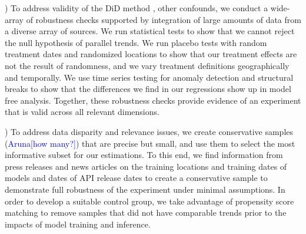 \documentclass[sigconf]{acmart}
\newcommand{\aruna}[1]{\textcolor{blue}{Aruna[#1]}}
\begin{document}
) To address validity of the DiD method , other confounds, we conduct a wide-array of robustness checks supported by integration of large amounts of data from a diverse array of sources. We run statistical tests to show that we cannot reject the null hypothesis of parallel trends. We run placebo tests with random treatment dates and randomized locations to show that our treatment effects are not the result of randomness, and we vary treatment definitions geographically and temporally. We use time series testing for anomaly detection and structural breaks to show that the differences we find in our regressions show up in model free analysis. Together, these robustness checks provide evidence of an experiment that is valid across all relevant dimensions.

) To address data disparity and relevance issues, we create conservative samples (\aruna{how many?}) that are precise but small, and use them to select the most informative subset for our estimations. To this end, we find information from press releases and news articles on the training locations and training dates of models and dates of API release dates to create a conservative sample to demonstrate full robustness of the experiment under minimal assumptions. In order to develop a suitable control group, we take advantage of propensity score matching to remove samples that did not have comparable trends prior to the impacts of model training and inference.



\end{document}
